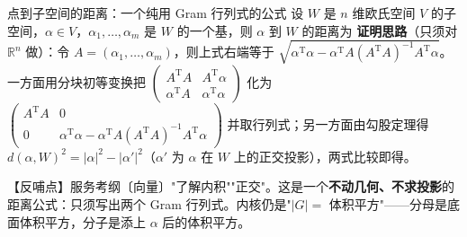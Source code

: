 \begin{fdeep}{点到子空间的距离：一个纯用 Gram 行列式的公式}
设 $W$ 是 $n$ 维欧氏空间 $V$ 的子空间，$\alpha\in V$，$\alpha_{1},\dots,\alpha_{m}$ 是 $W$ 的一个基，则 $\alpha$ 到 $W$ 的距离为
\textbf{证明思路}（只须对 $\mathbb R^{n}$ 做）：令 $A=(\alpha_{1},\dots,\alpha_{m})$，则上式右端等于 $\sqrt{\alpha^{\mathrm T}\alpha-\alpha^{\mathrm T}A(A^{\mathrm T}A)^{-1}A^{\mathrm T}\alpha}$。一方面用分块初等变换把 $\begin{pmatrix}A^{\mathrm T}A&A^{\mathrm T}\alpha\\ \alpha^{\mathrm T}A&\alpha^{\mathrm T}\alpha\end{pmatrix}$ 化为 $\begin{pmatrix}A^{\mathrm T}A&0\\ 0&\alpha^{\mathrm T}\alpha-\alpha^{\mathrm T}A(A^{\mathrm T}A)^{-1}A^{\mathrm T}\alpha\end{pmatrix}$ 并取行列式；另一方面由勾股定理得 $d(\alpha,W)^{2}=|\alpha|^{2}-|\alpha'|^{2}$（$\alpha'$ 为 $\alpha$ 在 $W$ 上的正交投影），两式比较即得。

【反哺点】服务考纲〔向量〕"了解内积""正交"。这是一个\textbf{不动几何、不求投影}的距离公式：只须写出两个 Gram 行列式。内核仍是"$|G|=$ 体积平方"——分母是底面体积平方，分子是添上 $\alpha$ 后的体积平方。
\end{fdeep}


